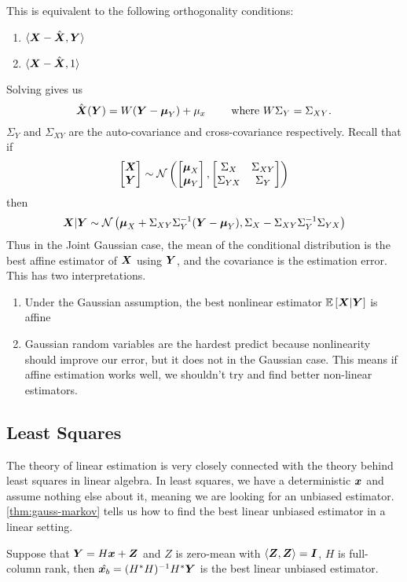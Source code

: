 This is equivalent to the following orthogonality conditions:
\begin{enumerate}
	\item $\langle \boldsymbol{X}-\hat{\boldsymbol{X}}, \boldsymbol{Y} \rangle$
	\item $\langle \boldsymbol{X}-\hat{\boldsymbol{X}}, 1 \rangle$
\end{enumerate}
Solving gives us
\[
	\hat{\boldsymbol{X}}(\boldsymbol{Y}) = W(\boldsymbol{Y}-\boldsymbol{\mu}_Y) + \mu_x \qquad \text{ where } W\Sigma_Y=\Sigma_{XY}.
\]
$\Sigma_Y$ and $\Sigma_{XY}$ are the auto-covariance and cross-covariance respectively.
Recall that if \[
	\begin{bmatrix} \boldsymbol{X} \\ \boldsymbol{Y} \end{bmatrix} \sim \mathcal{N}\left(\begin{bmatrix} \boldsymbol{\mu}_X \\ \boldsymbol{\mu}_Y \end{bmatrix}, \begin{bmatrix} \Sigma_X & \Sigma_{XY}\\ \Sigma_{YX} & \Sigma_Y \end{bmatrix}\right)
\]
then \[
	\boldsymbol{X}|\boldsymbol{Y} \sim \mathcal{N}\left(\boldsymbol{\mu}_X + \Sigma_{XY}\Sigma_Y^{-1}(\boldsymbol{Y}-\boldsymbol{\mu}_Y), \Sigma_X-\Sigma_{XY}\Sigma_Y^{-1}\Sigma_{YX} \right)
\]
Thus in the Joint Gaussian case, the mean of the conditional distribution is the best affine estimator of $\boldsymbol{X}$ using $\boldsymbol{Y}$, and the covariance is the estimation error.
This has two interpretations.
\begin{enumerate}
	\item Under the Gaussian assumption, the best nonlinear estimator $\mathbb{E}\left[\boldsymbol{X}|\boldsymbol{Y}\right]$ is affine
	\item Gaussian random variables are the hardest predict because nonlinearity should improve our error, but it does not in the Gaussian case. This means if affine estimation works well, we shouldn't try and find better non-linear estimators.
\end{enumerate}
\subsection{Least Squares}
The theory of linear estimation is very closely connected with the theory behind least squares in linear algebra.
In least squares, we have a deterministic $\boldsymbol{x}$ and assume nothing else about it, meaning we are looking for an unbiased estimator.
\cref{thm:gauss-markov} tells us how to find the best linear unbiased estimator in a linear setting.
\begin{theorem}
		Suppose that $\boldsymbol{Y}=H\boldsymbol{x}+\boldsymbol{Z}$ and $Z$ is zero-mean with $\langle \boldsymbol{Z}, \boldsymbol{Z} \rangle = \boldsymbol{I}$, $H$ is full-column rank, then $\hat{\boldsymbol{x}_b} = (H^*H)^{-1}H^*\boldsymbol{Y}$ is the best linear unbiased estimator.
	\label{thm:gauss-markov}
\end{theorem}
